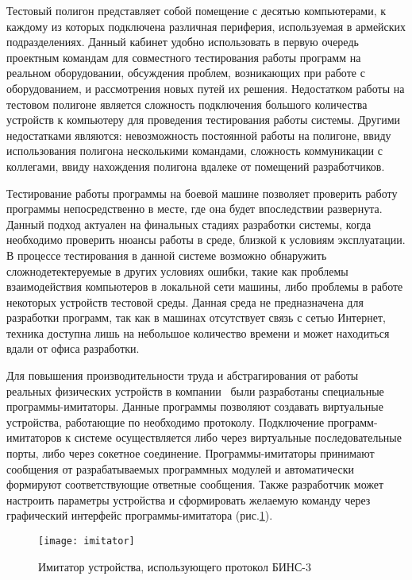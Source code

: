 Тестовый полигон представляет собой помещение с десятью компьютерами, к каждому из которых подключена различная
периферия, используемая в армейских подразделениях. Данный кабинет удобно использовать в первую очередь проектным командам для
совместного тестирования работы программ на реальном оборудовании, обсуждения проблем, возникающих при работе с
оборудованием, и рассмотрения новых путей их решения. Недостатком работы на тестовом полигоне является сложность
подключения большого количества устройств к компьютеру для проведения тестирования работы системы. Другими недостатками
являются: невозможность постоянной работы на полигоне, ввиду использования полигона несколькими командами, сложность
коммуникации с коллегами, ввиду нахождения полигона вдалеке от помещений разработчиков.

Тестирование работы программы на боевой машине позволяет проверить работу программы непосредственно в месте, где она
будет впоследствии развернута. Данный подход актуален на финальных стадиях разработки системы, когда необходимо
проверить нюансы работы в среде, близкой к условиям эксплуатации. В процессе тестирования в данной системе возможно
обнаружить сложнодетектеруемые в других условиях ошибки, такие как проблемы взаимодействия компьютеров в локальной сети
машины, либо проблемы в работе некоторых устройств тестовой среды. Данная среда не предназначена для разработки
программ, так как в машинах отсутствует связь с сетью Интернет, техника доступна лишь на небольшое количество времени и
может находиться вдали от офиса разработки.

Для повышения производительности труда и абстрагирования от работы реальных физических устройств в компании \company~были
разработаны специальные программы-имитаторы. Данные программы позволяют создавать виртуальные устройства, работающие по
необходимо протоколу. Подключение программ-имитаторов к системе осуществляется либо через виртуальные последовательные
порты, либо через сокетное соединение. Программы-имитаторы принимают сообщения от разрабатываемых программных модулей и
автоматически формируют соответствующие ответные сообщения. Также разработчик может настроить параметры устройства и
сформировать желаемую команду через графический интерфейс программы-имитатора (рис.\ref{fig:test:imitators:imitator}).
\begin{figure}[htb]
	\centering
	\texttt{[image: imitator]}
	\caption{Имитатор устройства, использующего протокол БИНС-3}
	\label{fig:test:imitators:imitator}
\end{figure}
